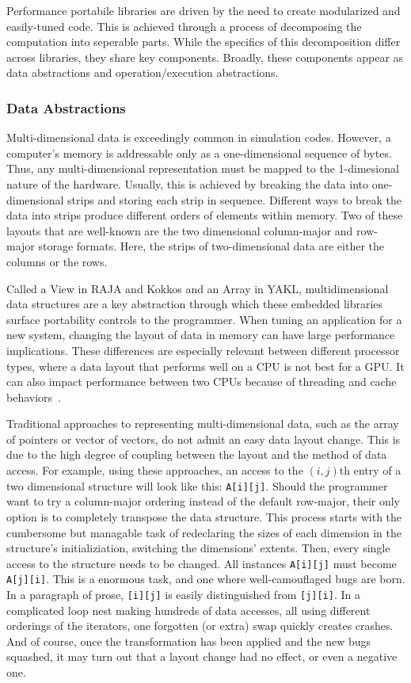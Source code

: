 Performance portabile libraries are driven by the need to create modularized and easily-tuned code.
This is achieved through a process of decomposing the computation into seperable parts.
While the specifics of this decomposition differ across libraries, they share key components.
Broadly, these components appear as data abstractions and operation/execution abstractions.

\subsubsection{Data Abstractions}
Multi-dimensional data is exceedingly common in simulation codes.
However, a computer's memory is addressable only as a one-dimensional sequence of bytes.
Thus, any multi-dimensional representation must be mapped to the 1-dimesional nature of the hardware.
Usually, this is achieved by breaking the data into one-dimensional strips and storing each strip in sequence.
Different ways to break the data into strips produce different orders of elements within memory.
Two of these layouts that are well-known are the two dimensional column-major and row-major storage formats.
Here, the strips of two-dimensional data are either the columns or the rows.

Called a View in RAJA and Kokkos and an Array in YAKL, multidimensional data structures are a key abstraction through which these embedded libraries surface portability controls to the programmer.
When tuning an application for a new system, changing the layout of data in memory can have large performance implications.
These differences are especially relevant between different processor types, where a data layout that performs well on a CPU is not best for a GPU.
It can also impact performance between two CPUs because of threading and cache behaviors~\cite{trott2021kokkos}.

Traditional approaches to representing multi-dimensional data, such as the array of pointers or vector of vectors, do not admit an easy data layout change.
This is due to the high degree of coupling between the layout and the method of data access. 
For example, using these approaches, an access to the $(i,j)$th entry of a two dimensional structure will look like this: \verb.A[i][j]..
Should the programmer want to try a column-major ordering instead of the default row-major, their only option is to completely transpose the data structure.
This process starts with the cumbersome but managable task of redeclaring the sizes of each dimension in the structure's initializiation, switching the dimensions' extents.
Then, every single access to the structure needs to be changed. 
All instances \verb.A[i][j]. must become \verb.A[j][i]..
This is a enormous task, and one where well-camouflaged bugs are born. 
In a paragraph of prose, \verb.[i][j]. is easily distinguished from \verb.[j][i]..
In a complicated loop nest making hundreds of data accesses, all using different orderings of the iterators, one forgotten (or extra) swap quickly creates crashes.
And of course, once the transformation has been applied and the new bugs squashed, it may turn out that a layout change had no effect, or even a negative one.

